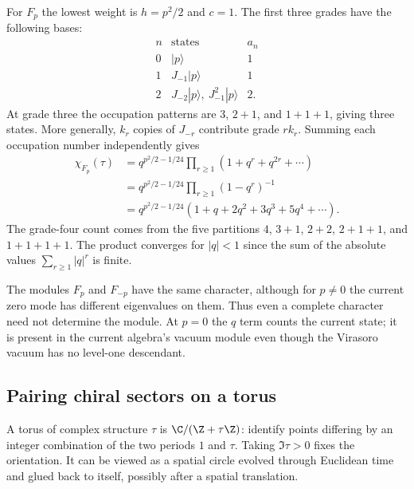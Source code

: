 \begin{example}
\label{ex:cft-fock-character}
For $F_p$ the lowest weight is $h=p^2/2$ and $c=1$.
The first three grades have the following bases:
\[
\begin{array}{c|l|c}
 n&\text{states}&a_n\\ \hline
 0&|p\rangle&1\\
 1&J_{-1}|p\rangle&1\\
 2&J_{-2}|p\rangle,\ J_{-1}^2|p\rangle&2.
\end{array}
\]
At grade three the occupation patterns are $3$, $2+1$, and
$1+1+1$, giving three states. More generally, $k_r$ copies of
$J_{-r}$ contribute grade $r k_r$. Summing each occupation number
independently gives
\begin{align*}
 \chi_{F_p}(\tau)
 &=q^{p^2/2-1/24}\prod_{r\ge1}
                 (1+q^r+q^{2r}+\cdots)\\
 &=q^{p^2/2-1/24}\prod_{r\ge1}(1-q^r)^{-1}\\
 &=q^{p^2/2-1/24}(1+q+2q^2+3q^3+5q^4+\cdots).
\end{align*}
The grade-four count comes from the five partitions
$4$, $3+1$, $2+2$, $2+1+1$, and $1+1+1+1$.
The product converges for $|q|<1$ since the sum of the absolute
values $\sum_{r\ge1}|q|^r$ is finite.

The modules $F_p$ and $F_{-p}$ have the same character, although
for $p\ne0$ the current zero mode has different eigenvalues on them.
Thus even a complete character need not determine the module.
At $p=0$ the $q$ term counts the current state; it is present in
the current algebra's vacuum module even though the Virasoro vacuum
has no level-one descendant.
\end{example}

\subsection{Pairing chiral sectors on a torus}

A torus of complex structure $\tau$ is
$\C/(\Z+\tau\Z)$: identify points differing by an integer
combination of the two periods $1$ and $\tau$. Taking
$\Im\tau>0$ fixes the orientation. It can be viewed as a spatial
circle evolved through Euclidean time and glued back to itself,
possibly after a spatial translation.

